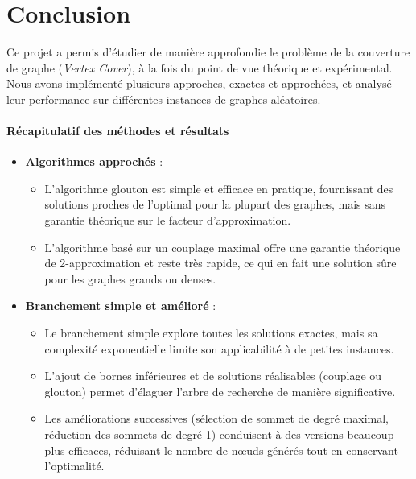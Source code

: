 \documentclass[11pt,a4paper]{article}
\begin{document}
\section{Conclusion}

Ce projet a permis d’étudier de manière approfondie le problème de la couverture de graphe (\textit{Vertex Cover}), à la fois du point de vue théorique et expérimental. Nous avons implémenté plusieurs approches, exactes et approchées, et analysé leur performance sur différentes instances de graphes aléatoires.

\paragraph{Récapitulatif des méthodes et résultats}
\begin{itemize}
    \item \textbf{Algorithmes approchés} : 
    \begin{itemize}
        \item L’algorithme glouton est simple et efficace en pratique, fournissant des solutions proches de l’optimal pour la plupart des graphes, mais sans garantie théorique sur le facteur d’approximation.
        \item L’algorithme basé sur un couplage maximal offre une garantie théorique de 2-approximation et reste très rapide, ce qui en fait une solution sûre pour les graphes grands ou denses.
    \end{itemize}
    \item \textbf{Branchement simple et amélioré} : 
    \begin{itemize}
        \item Le branchement simple explore toutes les solutions exactes, mais sa complexité exponentielle limite son applicabilité à de petites instances.
        \item L’ajout de bornes inférieures et de solutions réalisables (couplage ou glouton) permet d’élaguer l’arbre de recherche de manière significative.
        \item Les améliorations successives (sélection de sommet de degré maximal, réduction des sommets de degré 1) conduisent à des versions beaucoup plus efficaces, réduisant le nombre de nœuds générés tout en conservant l’optimalité.
    \end{itemize}
\end{itemize}
\end{document}
